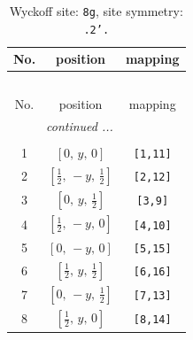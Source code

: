 \documentclass[fleqn,8pt]{jsarticle}
\begin{document}
\renewcommand{\arraystretch}{1.2}
\begin{longtable}{ccc}
\caption{Wyckoff site: {\tt 8g}, site symmetry: {\tt .2'.}}
 \\
 \hline \hline
No. & position & mapping \\ \hline \endfirsthead

\multicolumn{2}{l}{\tablename\ \thetable{}} \\
 \hline \hline
No. & position & mapping \\ \hline \endhead

 \hline \hline
\multicolumn{2}{r}{\footnotesize\it continued ...} \\ \endfoot

 \hline \hline
\multicolumn{2}{r}{} \\ \endlastfoot

1 & $\left[ 0,\, y,\, 0 \right]$ & {\tt [1,11]} \\ \hline
2 & $\left[ \frac{1}{2},\, - y,\, \frac{1}{2} \right]$ & {\tt [2,12]} \\ \hline
3 & $\left[ 0,\, y,\, \frac{1}{2} \right]$ & {\tt [3,9]} \\ \hline
4 & $\left[ \frac{1}{2},\, - y,\, 0 \right]$ & {\tt [4,10]} \\ \hline
5 & $\left[ 0,\, - y,\, 0 \right]$ & {\tt [5,15]} \\ \hline
6 & $\left[ \frac{1}{2},\, y,\, \frac{1}{2} \right]$ & {\tt [6,16]} \\ \hline
7 & $\left[ 0,\, - y,\, \frac{1}{2} \right]$ & {\tt [7,13]} \\ \hline
8 & $\left[ \frac{1}{2},\, y,\, 0 \right]$ & {\tt [8,14]} \\
\end{longtable}
\renewcommand{\arraystretch}{1.2}
\end{document}
